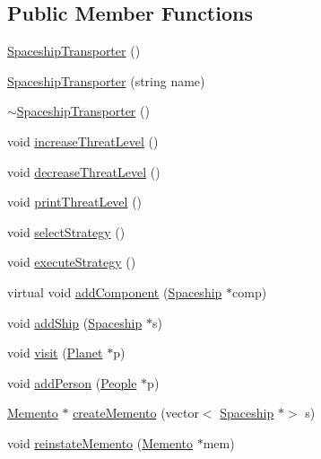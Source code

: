 \subsection*{Public Member Functions}
\begin{DoxyCompactItemize}
\item 
\hyperlink{classSpaceshipTransporter_a4478bc1ce68fb2306fb31849123b3eae}{Spaceship\+Transporter} ()
\item 
\hyperlink{classSpaceshipTransporter_a6c6a1df8547e7ab9988f9a5f26403e0b}{Spaceship\+Transporter} (string name)
\item 
\hyperlink{classSpaceshipTransporter_a58a77ccda8effc3cfdb071c8ffa40929}{$\sim$\+Spaceship\+Transporter} ()
\item 
void \hyperlink{classSpaceshipTransporter_ac581cb475c2eeab71c976d708f3fcb87}{increase\+Threat\+Level} ()
\item 
void \hyperlink{classSpaceshipTransporter_aab6415c16cb8e3fd511a995846099068}{decrease\+Threat\+Level} ()
\item 
void \hyperlink{classSpaceshipTransporter_ae153196ed515ac051be2ef7aa225c064}{print\+Threat\+Level} ()
\item 
void \hyperlink{classSpaceshipTransporter_a4106704a6ce41243c93594d7f492f33a}{select\+Strategy} ()
\item 
void \hyperlink{classSpaceshipTransporter_a0d8d15f2aba06b89da67a1812d783bfd}{execute\+Strategy} ()
\item 
virtual void \hyperlink{classSpaceshipTransporter_acd55c6864eab86db5e0485beeec4e8b9}{add\+Component} (\hyperlink{classSpaceship}{Spaceship} $\ast$comp)
\item 
void \hyperlink{classSpaceshipTransporter_a493a4ba44d26a2ae4e85b79e6970fb91}{add\+Ship} (\hyperlink{classSpaceship}{Spaceship} $\ast$s)
\item 
void \hyperlink{classSpaceshipTransporter_a03c84b4f53adb249e915158901cfef28}{visit} (\hyperlink{classPlanet}{Planet} $\ast$p)
\item 
void \hyperlink{classSpaceshipTransporter_a5c9ee82688e97545baa7a876e69d5dd3}{add\+Person} (\hyperlink{classPeople}{People} $\ast$p)
\item 
\hyperlink{classMemento}{Memento} $\ast$ \hyperlink{classSpaceshipTransporter_a40fe0a655d0d2d1fecadff29439b9ddd}{create\+Memento} (vector$<$ \hyperlink{classSpaceship}{Spaceship} $\ast$$>$ s)
\item 
void \hyperlink{classSpaceshipTransporter_a41af86fad998c5fb7a86d03e7a600ab7}{reinstate\+Memento} (\hyperlink{classMemento}{Memento} $\ast$mem)
\end{DoxyCompactItemize}
